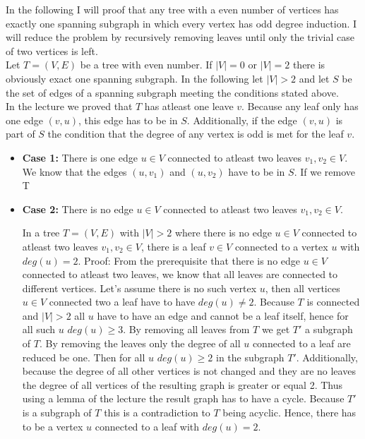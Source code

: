 \documentclass[a4paper]{article}
\begin{document}
	\newpage
	\begin{solution}{6}
	In the following I will proof that any tree with a even number of vertices has exactly one spanning subgraph in which every vertex has odd degree induction. I will reduce the problem by recursively removing leaves until only the trivial case of two vertices is left. \\
	Let $T=(V, E)$ be a tree with even number. If $|V|=0$ or $|V|=2$ there is obviously exact one spanning subgraph. 
	In the following let $|V|>2$ and let $S$ be the set of edges of a spanning subgraph meeting the conditions stated above. \\
	In the lecture we proved that $T$ has atleast one leave $v$. 
	Because any leaf only has one edge $(v,u)$, this edge has to be in $S$. 
	Additionally, if the edge $(v,u)$ is part of $S$ the condition that the degree of any vertex is odd is met for the leaf $v$. 
		
	\begin{itemize}
		\item \textbf{Case 1:} There is one edge $u \in V$ connected to atleast two leaves $v_1, v_2 \in V$. \\
		We know that the edges $(u,v_1)$ and $(u,v_2)$ have to be in $S$. If we remove T
		
		\item \textbf{Case 2:} There is no edge $u \in V$ connected to atleast two leaves $v_1, v_2 \in V$. \\
		
		\begin{lemma}{In a tree $T=(V,E)$ with $|V|>2$ where there is no edge $u \in V$ connected to atleast two leaves $v_1, v_2 \in V$, there is a leaf $v \in V$ connected to a vertex $u$ with $deg(u) = 2$.}
		Proof: From the prerequisite that there is no edge $u \in V$ connected to atleast two leaves, we know that all leaves are connected to different vertices. 
		Let's assume there is no such vertex $u$, then all vertices $u \in V$ connected two a leaf have to have $deg(u) \neq 2$. 
		Because $T$ is connected and $|V|>2$ all $u$ have to have an edge and cannot be a leaf itself, hence for all such $u$ $deg(u) \geq 3$. 
		By removing all leaves from $T$ we get $T'$ a subgraph of $T$. By removing the leaves only the degree of all $u$ connected to a leaf are reduced be one. 
		Then for all $u$ $deg(u) \geq 2$ in the subgraph $T'$. 
		Additionally, because the degree of all other vertices is not changed and they are no leaves the degree of all vertices of the resulting graph is greater or equal 2. 
		Thus using a lemma of the lecture the result graph has to have a cycle. 
		Because $T'$ is a subgraph of $T$ this is a contradiction to $T$ being acyclic. 
		Hence, there has to be a vertex $u$ connected to a leaf with $deg(u)=2$. 		
		\end{lemma}
		

\end{itemize}
\end{solution}
\end{document}
